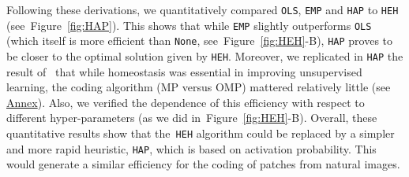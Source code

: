 \documentclass[vision,article,submit,oneauthor,pdftex]{Definitions/mdpi}
\newcommand{\seeFig}[1]{Figure~\ref{fig:#1}}%
\begin{document}
Following these derivations, we quantitatively compared \texttt{OLS}, \texttt{EMP} and \texttt{HAP} to \texttt{HEH} (see~\seeFig{HAP}). This shows that while \texttt{EMP} slightly outperforms \texttt{OLS} (which itself is more efficient than \texttt{None}, see~\seeFig{HEH}-B), \texttt{HAP} proves to be closer to the optimal solution given by \texttt{HEH}. %
Moreover, we replicated in \texttt{HAP} the result of~\cite{Sandin17} that while homeostasis was essential in improving unsupervised learning, the coding algorithm (MP versus OMP) mattered relatively little (see \href{https://spikeai.github.io/HULK/#Testing-different-algorithms}{Annex}). Also, we verified the dependence of this efficiency with respect to different hyper-parameters (as we did in~\seeFig{HEH}-B). %
Overall, these quantitative results show that the~\texttt{HEH} algorithm could be replaced by a simpler and more rapid heuristic, \texttt{HAP}, which is based on activation probability. This would generate a similar efficiency for the coding of patches from natural images.
\end{document}
